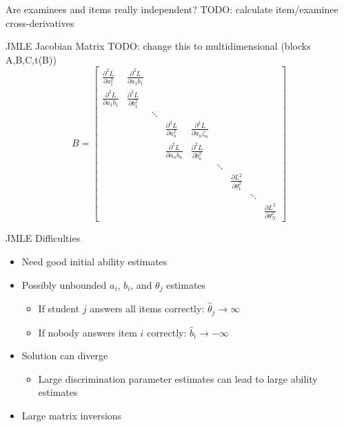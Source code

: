 \documentclass{beamer}
\theoremstyle{definition}
\begin{document}
\begin{frame}{Are examinees and items really independent?}
  TODO: calculate item/examinee cross-derivatives %
\end{frame}

\begin{frame}{JMLE Jacobian Matrix}
  TODO: change this to multidimensional (blocks A,B,C,t(B))
\[B = \begin{bmatrix}
\frac{\partial^2L}{\partial a_1^2} & \frac{\partial^2L}{\partial a_1 b_1} & & & & & & & \\
\frac{\partial^2L}{\partial a_1 b_1} & \frac{\partial^2L}{\partial b_1^2} & & & & & & & \\
& & \ddots & & & & & & \\
& & & \frac{\partial^2L}{\partial a_n^2} & \frac{\partial^2L}{\partial a_n\zeta_n} & & & & \\
& & & \frac{\partial^2L}{\partial a_n b_n} & \frac{\partial^2L}{\partial b_n^2} & & & & \\
& & & & & \ddots & & & \\
& & & & & & \frac{\partial L^2}{\partial \theta_1^2} & & \\
& & & & & & & \ddots & \\
& & & & & & & & \frac{\partial L^2}{\partial \theta_N^2} 
\end{bmatrix}\]
\end{frame}

\begin{frame}{JMLE Difficulties}
\begin{itemize}
  \item Need good initial ability estimates
  \item Possibly unbounded $a_i$, $b_i$, and $\theta_j$ estimates
    \begin{itemize}
      \item If student $j$ answers all items correctly: $\hat \theta_j \to \infty$
      \item If nobody answers item $i$ correctly: $\hat b_i \to -\infty$
    \end{itemize}
  \item Solution can diverge
  \begin{itemize}
    \item Large discrimination parameter estimates can lead to large ability estimates
  \end{itemize}
\item Large matrix inversions
\end{itemize}
\end{frame}
\end{document}
